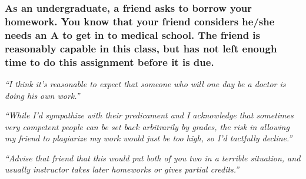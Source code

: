 \documentclass[12pt]{beamer}
\newcommand\ans[1]{{\it ``#1''}}
\newcommand\gap{\vspace{5mm}}
\begin{document}
\begin{frame}   %

\frametitle{As an undergraduate, a friend asks to borrow your homework. You know that your friend considers he/she needs an A to get in to medical school. The friend is reasonably capable in this class, but has not left enough time to do this assignment before it is due.}

\ans{I think it’s reasonable to expect that someone who will one day be a doctor is doing his own work.}


\ans{While I’d sympathize with their predicament and I acknowledge that sometimes very competent people can be set back arbitrarily by grades, the risk in allowing my friend to plagiarize my work would just be too high, so I’d tactfully decline.}



\ans{Advise  that  friend  that  this  would  put  both  of  you  two  in  a  terrible  situation,  and usually instructor takes later homeworks or gives partial credits.}


\gap 




\end{frame}
\end{document}
